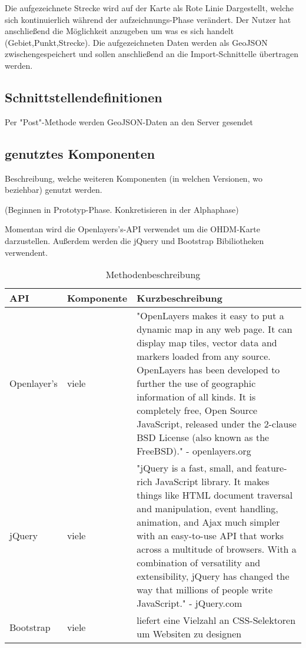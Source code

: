 \documentclass[a4paper, 12.5pt]{scrartcl}
\begin{document}
Die aufgezeichnete Strecke wird auf der Karte als Rote Linie Dargestellt, welche sich kontinuierlich während der aufzeichnungs-Phase verändert. Der Nutzer hat anschließend die Möglichkeit anzugeben um was es sich handelt (Gebiet,Punkt,Strecke). Die aufgezeichneten Daten werden als GeoJSON zwischengespeichert und sollen anschließend an die Import-Schnittelle übertragen werden.

\subsection{Schnittstellendefinitionen}

Per "Post"-Methode werden GeoJSON-Daten an den Server gesendet

\subsection{genutztes Komponenten}
Beschreibung, welche weiteren Komponenten (in welchen Versionen, wo beziehbar) genutzt werden.

(Beginnen in Prototyp-Phase. Konkretisieren in der Alphaphase)

Momentan wird die Openlayers's-API verwendet um die OHDM-Karte darzustellen.
Außerdem werden die jQuery und Bootstrap Bibiliotheken verwendent.

\begin{table}[h]
    \begin{tabular}{|l|l|p{4cm}|}
        \hline
        API & Komponente & Kurzbeschreibung \\
        \hline
        Openlayer's & viele & "OpenLayers makes it easy to put a dynamic map in any web page. It can display map tiles, vector data and markers loaded from any source. OpenLayers has been developed to further the use of geographic information of all kinds. It is completely free, Open Source JavaScript, released under the 2-clause BSD License (also known as the FreeBSD)." - openlayers.org\newline
        \\
        \hline
        jQuery & viele & "jQuery is a fast, small, and feature-rich JavaScript library. It makes things like HTML document traversal and manipulation, event handling, animation, and Ajax much simpler with an easy-to-use API that works across a multitude of browsers. With a combination of versatility and extensibility, jQuery has changed the way that millions of people write JavaScript." - jQuery.com\newline
        \\
        \hline
        Bootstrap & viele & liefert eine Vielzahl an CSS-Selektoren um Websiten zu designen \newline
        \\
        \hline
    \end{tabular}
    \caption{Methodenbeschreibung}
\end{table}
\end{document}
